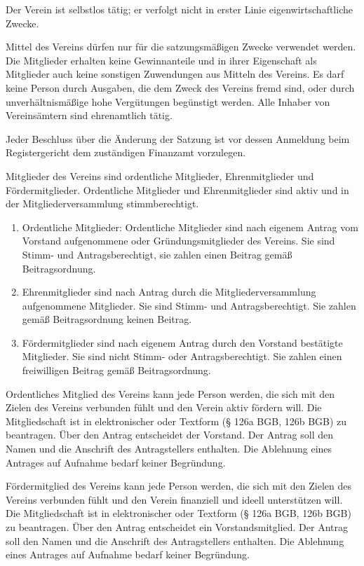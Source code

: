 \documentclass[parskip]{scrartcl}
\begin{document}
\begin{contract}
Der Verein ist selbstlos tätig; er verfolgt nicht in erster Linie eigenwirtschaftliche Zwecke.

Mittel des Vereins dürfen nur für die satzungsmäßigen Zwecke verwendet werden. Die Mitglieder erhalten keine Gewinnanteile und in ihrer Eigenschaft als Mitglieder auch keine sonstigen Zuwendungen aus Mitteln des Vereins. Es darf keine Person durch Ausgaben, die dem Zweck des Vereins fremd sind, oder durch unverhältnismäßige hohe Vergütungen begünstigt werden. Alle Inhaber von Vereinsämtern sind ehrenamtlich tätig.

Jeder Beschluss über die Änderung der Satzung ist vor dessen Anmeldung beim Registergericht dem zuständigen Finanzamt vorzulegen.


Mitglieder des Vereins sind ordentliche Mitglieder, Ehrenmitglieder und Fördermitglieder. Ordentliche Mitglieder und Ehrenmitglieder sind aktiv und in der Mitgliederversammlung stimmberechtigt.

\begin{enumerate}
\item Ordentliche Mitglieder: Ordentliche Mitglieder sind nach eigenem Antrag vom Vorstand aufgenommene oder Gründungsmitglieder des Vereins. Sie sind Stimm- und Antragsberechtigt, sie zahlen einen Beitrag gemäß Beitragsordnung.
\item Ehrenmitglieder sind nach Antrag durch die Mitgliederversammlung aufgenommene Mitglieder. Sie sind Stimm- und Antragsberechtigt. Sie zahlen gemäß Beitragsordnung keinen Beitrag.
\item Fördermitglieder sind nach eigenem Antrag durch den Vorstand bestätigte Mitglieder. Sie sind nicht Stimm- oder Antragsberechtigt. Sie zahlen einen freiwilligen Beitrag gemäß Beitragsordnung.
\end{enumerate}

Ordentliches Mitglied des Vereins kann jede Person werden, die sich mit den Zielen des Vereins verbunden fühlt und den Verein aktiv fördern will. Die Mitgliedschaft ist in elektronischer oder Textform (§ 126a BGB, 126b BGB) zu beantragen. Über den Antrag entscheidet der Vorstand. Der Antrag soll den Namen und die Anschrift des Antragstellers enthalten. Die Ablehnung eines Antrages auf Aufnahme bedarf keiner Begründung.

Fördermitglied des Vereins kann jede Person werden, die sich mit den Zielen des Vereins verbunden fühlt und den Verein finanziell und ideell unterstützen will. Die Mitgliedschaft ist in elektronischer oder Textform (§ 126a BGB, 126b BGB) zu beantragen. Über den Antrag entscheidet ein Vorstandsmitglied. Der Antrag soll den Namen und die Anschrift des Antragstellers enthalten. Die Ablehnung eines Antrages auf Aufnahme bedarf keiner Begründung.


\end{contract}
\end{document}
